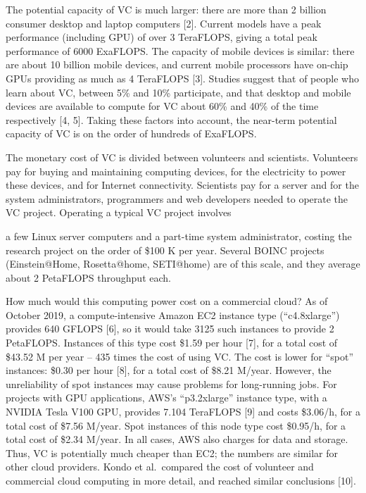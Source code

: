 \documentclass[
]{article}
\begin{document}
The potential capacity of VC is much larger: there are more than 2
billion consumer desktop and laptop computers {[}2{]}. Current models
have a peak performance (including GPU) of over 3 TeraFLOPS, giving a
total peak performance of 6000 ExaFLOPS. The capacity of mobile devices
is similar: there are about 10 billion mobile devices, and current
mobile processors have on-chip GPUs providing as much as 4 TeraFLOPS
{[}3{]}. Studies suggest that of people who learn about VC, between 5\%
and 10\% participate, and that desktop and mobile devices are available
to compute for VC about 60\% and 40\% of the time respectively {[}4,
5{]}. Taking these factors into account, the near-term potential
capacity of VC is on the order of hundreds of ExaFLOPS.

The monetary cost of VC is divided between volunteers and scientists.
Volunteers pay for buying and maintaining computing devices, for the
electricity to power these devices, and for Internet connectivity.
Scientists pay for a server and for the system administrators,
programmers and web developers needed to operate the VC project.
Operating a typical VC project involves

a few Linux server computers and a part-time system administrator,
costing the research project on the order of \$100 K per year. Several
BOINC projects (Einstein@Home, Rosetta@home, SETI@home) are of this
scale, and they average about 2 PetaFLOPS throughput each.

How much would this computing power cost on a commercial cloud? As of
October 2019, a compute-intensive Amazon EC2 instance type
(``c4.8xlarge'') provides 640 GFLOPS {[}6{]}, so it would take 3125 such
instances to provide 2 PetaFLOPS. Instances of this type cost \$1.59 per
hour {[}7{]}, for a total cost of \$43.52 M per year -- 435 times the
cost of using VC. The cost is lower for ``spot'' instances: \$0.30 per
hour {[}8{]}, for a total cost of \$8.21 M/year. However, the
unreliability of spot instances may cause problems for long-running
jobs. For projects with GPU applications, AWS's ``p3.2xlarge'' instance
type, with a NVIDIA Tesla V100 GPU, provides 7.104 TeraFLOPS {[}9{]} and
costs \$3.06/h, for a total cost of \$7.56 M/year. Spot instances of
this node type cost \$0.95/h, for a total cost of \$2.34 M/year. In all
cases, AWS also charges for data and storage. Thus, VC is potentially
much cheaper than EC2; the numbers are similar for other cloud
providers. Kondo et al.~compared the cost of volunteer and commercial
cloud computing in more detail, and reached similar conclusions
{[}10{]}.
\end{document}
